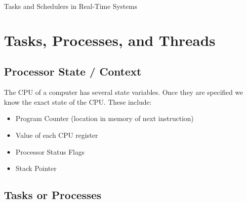 %
%
%
%
%
%
%
%
%
%
%

\begin{center}
{\Large Tasks and Schedulers in Real-Time Systems}
\end{center}

\section{Tasks, Processes, and Threads}
\subsection{Processor State / Context}

The CPU of a computer has several state variables.  Once they are
specified we know the exact state of the CPU.  These include:
\begin{itemize}
        \item Program Counter (location in memory of next instruction)
        \item Value of each CPU register
        \item Processor Status Flags
        \item Stack Pointer
\end{itemize}



\subsection{Tasks or Processes}

